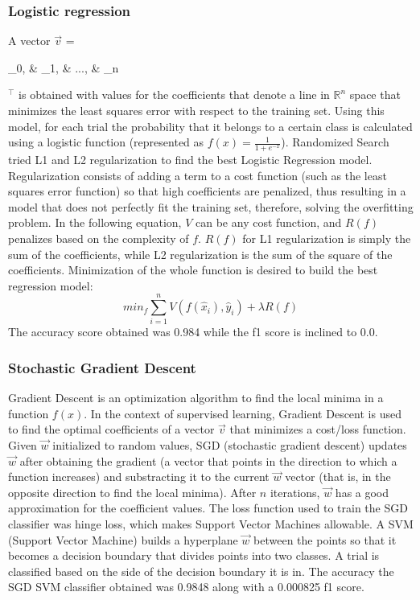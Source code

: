 \documentclass{article}
\begin{document}
		\subsubsection{Logistic regression}
			A vector $\vec{v}$ =
			\begin{bmatrix}
			    \theta_0, & \theta_1, & ..., & \theta_n \\
			\end{bmatrix}${^\intercal}$
			is obtained with values for the coefficients that denote a line in $\mathbb{R}^{n}$ space that minimizes the least squares error with respect to the training set. Using this model, for each trial the probability that it belongs to a certain class is calculated using a logistic function (represented as {$f(x)=\frac{1}{1+e^{-x}}$}). Randomized Search tried L1 and L2 regularization to find the best Logistic Regression model. Regularization consists of adding a term to a cost function (such as the least squares error function) so that high coefficients are penalized, thus resulting in a model that does not perfectly fit the training set, therefore, solving the overfitting problem. In the following equation, $V$ can be any cost function, and $R(f)$ penalizes based on the complexity of $f$. $R(f)$ for L1 regularization is simply the sum of the coefficients, while L2 regularization is the sum of the square of the coefficients. Minimization of the whole function is desired to build the best regression model: $$min_f \sum_{i=1}^{n} V(f(\hat x_i), \hat y_i) + \lambda R(f)$$
			The accuracy score obtained was 0.984 while the f1 score is inclined to 0.0.
		\subsubsection{Stochastic Gradient Descent}
			Gradient Descent is an optimization algorithm to find the local minima in a function $f(x)$. In the context of supervised learning, Gradient Descent is used to find the optimal coefficients of a vector $\vec{v}$ that minimizes a cost/loss function. Given $\vec{w}$ initialized to random values, SGD (stochastic gradient descent) updates $\vec{w}$ after obtaining the gradient (a vector that points in the direction to which a function increases) and substracting it to the current $\vec{w}$ vector (that is, in the opposite direction to find the local minima). After $n$ iterations, $\vec{w}$ has a good approximation for the coefficient values. The loss function used to train the SGD classifier was hinge loss, which makes Support Vector Machines allowable. A SVM (Support Vector Machine) builds a hyperplane $\vec{w}$ between the points so that it becomes a decision boundary that divides points into two classes. A trial is classified based on the side of the decision boundary it is in. The accuracy the SGD SVM classifier obtained was 0.9848 along with a 0.000825 f1 score.
\end{document}
